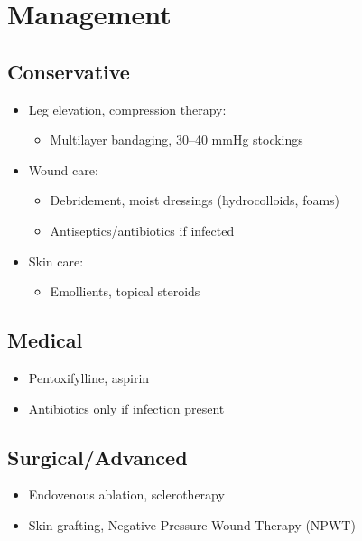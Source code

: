 \documentclass{article}
\begin{document}
\section*{Management}
\subsection*{Conservative}
\begin{itemize}[noitemsep]
    \item Leg elevation, compression therapy:
    \begin{itemize}
        \item Multilayer bandaging, 30–40 mmHg stockings
    \end{itemize}
    \item Wound care:
    \begin{itemize}
        \item Debridement, moist dressings (hydrocolloids, foams)
        \item Antiseptics/antibiotics if infected
    \end{itemize}
    \item Skin care:
    \begin{itemize}
        \item Emollients, topical steroids
    \end{itemize}
\end{itemize}

\subsection*{Medical}
\begin{itemize}[noitemsep]
    \item Pentoxifylline, aspirin
    \item Antibiotics only if infection present
\end{itemize}

\subsection*{Surgical/Advanced}
\begin{itemize}[noitemsep]
    \item Endovenous ablation, sclerotherapy
    \item Skin grafting, Negative Pressure Wound Therapy (NPWT)
\end{itemize}
\end{document}

